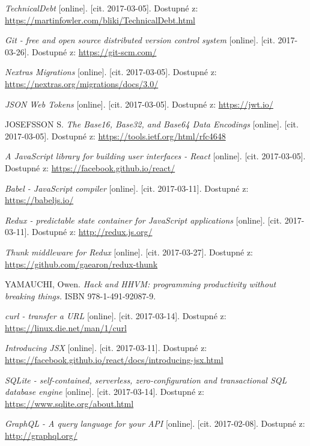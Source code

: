 \begin{thebibliography}{99}
\textit{TechnicalDebt} [online]. [cit. 2017-03-05]. Dostupné z: \url{https://martinfowler.com/bliki/TechnicalDebt.html}

\textit{Git - free and open source distributed version control system} [online]. [cit. 2017-03-26]. Dostupné z: \url{https://git-scm.com/}

\textit{Nextras Migrations} [online]. [cit. 2017-03-05]. Dostupné z: \url{https://nextras.org/migrations/docs/3.0/}

\textit{JSON Web Tokens} [online]. [cit. 2017-03-05]. Dostupné z: \url{https://jwt.io/}

JOSEFSSON S. \textit{The Base16, Base32, and Base64 Data Encodings} [online]. [cit. 2017-03-05]. Dostupné z: \url{https://tools.ietf.org/html/rfc4648}

\textit{A JavaScript library for building user interfaces - React} [online]. [cit. 2017-03-05]. Dostupné z: \url{https://facebook.github.io/react/}

\textit{Babel - JavaScript compiler} [online]. [cit. 2017-03-11]. Dostupné z: \url{https://babeljs.io/}

\textit{Redux - predictable state container for JavaScript applications} [online]. [cit. 2017-03-11]. Dostupné z: \url{http://redux.js.org/}

\textit{Thunk middleware for Redux} [online]. [cit. 2017-03-27]. Dostupné z: \url{https://github.com/gaearon/redux-thunk}

YAMAUCHI, Owen. \textit{Hack and HHVM: programming productivity without breaking things.} ISBN 978-1-491-92087-9.

\textit{curl - transfer a URL} [online]. [cit. 2017-03-14]. Dostupné z: \url{https://linux.die.net/man/1/curl}

\textit{Introducing JSX} [online]. [cit. 2017-03-11]. Dostupné z: \url{https://facebook.github.io/react/docs/introducing-jsx.html}

\textit{SQLite - self-contained, serverless, zero-configuration and transactional SQL database engine} [online]. [cit. 2017-03-14]. Dostupné z: \url{https://www.sqlite.org/about.html}

\textit{GraphQL - A query language for your API} [online]. [cit. 2017-02-08]. Dostupné z: \url{http://graphql.org/}


\end{thebibliography}
